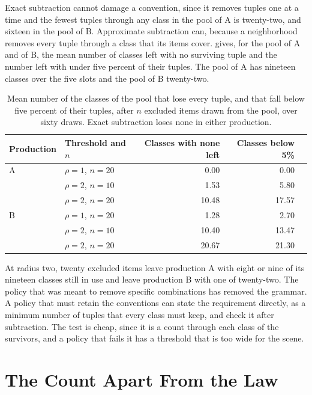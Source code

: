 \documentclass[11pt,twoside,openright]{book}
\theoremstyle{plain}
\theoremstyle{definition}
\theoremstyle{remark}
\begin{document}
Exact subtraction cannot damage a convention, since it removes tuples one at a time and the fewest tuples through any class in the pool of A is twenty-two, and sixteen in the pool of B. Approximate subtraction can, because a neighborhood removes every tuple through a class that its items cover.  gives, for the pool of A and of B, the mean number of classes left with no surviving tuple and the number left with under five percent of their tuples. The pool of A has nineteen classes over the five slots and the pool of B twenty-two.

\begin{table}[ht]
\centering
\begin{tabular}{@{}llrrr@{}}
\toprule
Production & Threshold and $n$ & Classes with none left & Classes below 5\%\\
\midrule
A & $\rho=1$, $n=20$ & 0.00 & 0.00\\
 & $\rho=2$, $n=10$ & 1.53 & 5.80\\
 & $\rho=2$, $n=20$ & 10.48 & 17.57\\
\midrule
B & $\rho=1$, $n=20$ & 1.28 & 2.70\\
 & $\rho=2$, $n=10$ & 10.40 & 13.47\\
 & $\rho=2$, $n=20$ & 20.67 & 21.30\\
\bottomrule
\end{tabular}
\caption{Mean number of the classes of the pool that lose every tuple, and that fall below five percent of their tuples, after $n$ excluded items drawn from the pool, over sixty draws. Exact subtraction loses none in either production.}\label{tab:gram15}
\end{table}

At radius two, twenty excluded items leave production A with eight or nine of its nineteen classes still in use and leave production B with one of twenty-two. The policy that was meant to remove specific combinations has removed the grammar. A policy that must retain the conventions can state the requirement directly, as a minimum number of tuples that every class must keep, and check it after subtraction. The test is cheap, since it is a count through each class of the survivors, and a policy that fails it has a threshold that is too wide for the scene.

\section{The Count Apart From the Law}\label{sec:law15}
\end{document}
